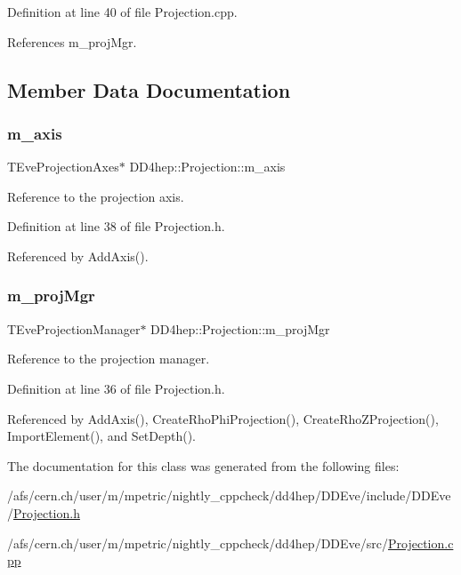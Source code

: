Definition at line 40 of file Projection.\+cpp.



References m\+\_\+proj\+Mgr.



\subsection{Member Data Documentation}
\hypertarget{class_d_d4hep_1_1_projection_a694863e25d4dab1fda8bf4221f099402}{}\label{class_d_d4hep_1_1_projection_a694863e25d4dab1fda8bf4221f099402} 
\subsubsection{\texorpdfstring{m\+\_\+axis}{m\_axis}}
{\footnotesize\ttfamily T\+Eve\+Projection\+Axes$\ast$ D\+D4hep\+::\+Projection\+::m\+\_\+axis\hspace{0.3cm}{\ttfamily [protected]}}



Reference to the projection axis. 



Definition at line 38 of file Projection.\+h.



Referenced by Add\+Axis().

\hypertarget{class_d_d4hep_1_1_projection_af3e297ffc1962b82749d48fe43ed6830}{}\label{class_d_d4hep_1_1_projection_af3e297ffc1962b82749d48fe43ed6830} 
\subsubsection{\texorpdfstring{m\+\_\+proj\+Mgr}{m\_projMgr}}
{\footnotesize\ttfamily T\+Eve\+Projection\+Manager$\ast$ D\+D4hep\+::\+Projection\+::m\+\_\+proj\+Mgr\hspace{0.3cm}{\ttfamily [protected]}}



Reference to the projection manager. 



Definition at line 36 of file Projection.\+h.



Referenced by Add\+Axis(), Create\+Rho\+Phi\+Projection(), Create\+Rho\+Z\+Projection(), Import\+Element(), and Set\+Depth().



The documentation for this class was generated from the following files\+:\begin{DoxyCompactItemize}
\item 
/afs/cern.\+ch/user/m/mpetric/nightly\+\_\+cppcheck/dd4hep/\+D\+D\+Eve/include/\+D\+D\+Eve/\hyperlink{_projection_8h}{Projection.\+h}\item 
/afs/cern.\+ch/user/m/mpetric/nightly\+\_\+cppcheck/dd4hep/\+D\+D\+Eve/src/\hyperlink{_projection_8cpp}{Projection.\+cpp}\end{DoxyCompactItemize}
